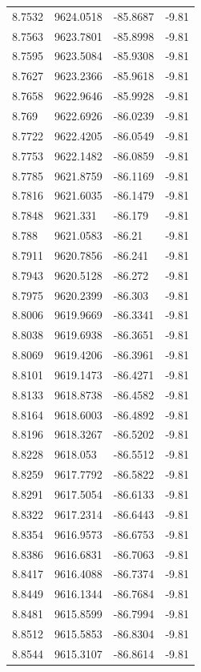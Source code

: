 \begin{table}[H]
\begin{tabular}{llll}
8.7532 & 9624.0518 & -85.8687 & -9.81 \\
8.7563 & 9623.7801 & -85.8998 & -9.81 \\
8.7595 & 9623.5084 & -85.9308 & -9.81 \\
8.7627 & 9623.2366 & -85.9618 & -9.81 \\
8.7658 & 9622.9646 & -85.9928 & -9.81 \\
8.769 & 9622.6926 & -86.0239 & -9.81 \\
8.7722 & 9622.4205 & -86.0549 & -9.81 \\
8.7753 & 9622.1482 & -86.0859 & -9.81 \\
8.7785 & 9621.8759 & -86.1169 & -9.81 \\
8.7816 & 9621.6035 & -86.1479 & -9.81 \\
8.7848 & 9621.331 & -86.179 & -9.81 \\
8.788 & 9621.0583 & -86.21 & -9.81 \\
8.7911 & 9620.7856 & -86.241 & -9.81 \\
8.7943 & 9620.5128 & -86.272 & -9.81 \\
8.7975 & 9620.2399 & -86.303 & -9.81 \\
8.8006 & 9619.9669 & -86.3341 & -9.81 \\
8.8038 & 9619.6938 & -86.3651 & -9.81 \\
8.8069 & 9619.4206 & -86.3961 & -9.81 \\
8.8101 & 9619.1473 & -86.4271 & -9.81 \\
8.8133 & 9618.8738 & -86.4582 & -9.81 \\
8.8164 & 9618.6003 & -86.4892 & -9.81 \\
8.8196 & 9618.3267 & -86.5202 & -9.81 \\
8.8228 & 9618.053 & -86.5512 & -9.81 \\
8.8259 & 9617.7792 & -86.5822 & -9.81 \\
8.8291 & 9617.5054 & -86.6133 & -9.81 \\
8.8322 & 9617.2314 & -86.6443 & -9.81 \\
8.8354 & 9616.9573 & -86.6753 & -9.81 \\
8.8386 & 9616.6831 & -86.7063 & -9.81 \\
8.8417 & 9616.4088 & -86.7374 & -9.81 \\
8.8449 & 9616.1344 & -86.7684 & -9.81 \\
8.8481 & 9615.8599 & -86.7994 & -9.81 \\
8.8512 & 9615.5853 & -86.8304 & -9.81 \\
8.8544 & 9615.3107 & -86.8614 & -9.81 \\

\end{tabular}
\end{table}
